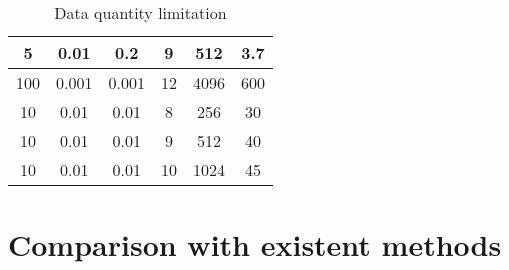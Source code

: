 \documentclass[12pt]{report}
\begin{document}
\begin{table}
\begin{tabular}{|c|c|c|c|c|c|}
\hline
5                                                              & 0.01                                                              & 0.2                                                          & 9                                                                 & 512                                                            & 3.7                                                                  \\ 
\hline
100                                                            & 0.001                                                             & 0.001                                                        & 12                                                                & 4096                                                           & 600                                                                  \\ 
\hline
10                                                             & 0.01                                                              & 0.01                                                         & 8                                                                 & 256                                                            & 30                                                                   \\ 
\hline
10                                                             & 0.01                                                              & 0.01                                                         & 9                                                                 & 512                                                            & 40                                                                   \\ 
\hline
10                                                             & 0.01                                                              & 0.01                                                         & 10                                                                & 1024                                                           & 45                                                                   \\
\hline
\end{tabular}
\caption{Data quantity limitation}
\label{tab:table}
\end{table}


\chapter{Comparison with existent methods}
\end{document}
